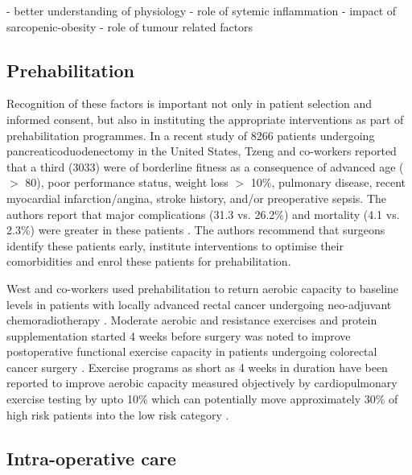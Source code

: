 - better understanding of physiology
- role of sytemic inflammation \parencite{van_heek_hospital_2005, ho_effect_2003, birkmeyer_surgeon_2003, halm_is_2002}
- impact of sarcopenic-obesity \parencite{joglekar_sarcopenia_2015, reisinger_sarcopenia_2015, gonzalez_obesity_2014}
- role of tumour related factors \parencite{williams_surgical_2014}

\subsection{Prehabilitation}


Recognition of these factors is important not only in patient selection and informed consent, but also in instituting the appropriate interventions as part of prehabilitation programmes. 
In a recent study of 8266 patients undergoing pancreaticoduodenectomy in the United States, Tzeng and co-workers reported that a third (3033) were of borderline fitness as a consequence of advanced age ($>$ 80), poor performance status, weight loss $>$ 10\%, pulmonary disease, recent myocardial infarction/angina, stroke history, and/or preoperative sepsis. 
The authors report that major complications (31.3 vs. 26.2\%) and mortality (4.1 vs. 2.3\%) were greater in these patients \parencite{tzeng_morbidity_2014}.
The authors recommend that surgeons identify these patients early, institute interventions to optimise their comorbidities and enrol these patients for prehabilitation. 

West and co-workers used prehabilitation to return aerobic capacity to baseline levels in patients with locally advanced rectal cancer undergoing neo-adjuvant chemoradiotherapy \parencite{west_effect_2015}.
Moderate aerobic and resistance exercises and protein supplementation started 4 weeks before surgery was noted to improve postoperative functional exercise capacity in patients undergoing colorectal cancer surgery \parencite{gillis_prehabilitation_2014}.
Exercise programs as short as 4 weeks in duration have been reported to improve aerobic capacity measured objectively by cardiopulmonary exercise testing by upto 10\% which can potentially move approximately 30\% of high risk patients into the low risk category \parencite{dunne_pmo-029_2012}.

\subsection{Intra-operative care}

